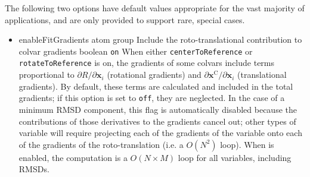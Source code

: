 The following two options have default values appropriate for the vast majority of applications, and are only provided to support rare, special cases.
\begin{itemize}

\item %
  \keydef%
    {enableFitGradients}{%
    atom group}{%
    Include the roto-translational contribution to colvar gradients}{%
    boolean}{%
    \texttt{on}}{%
    When either \texttt{centerToReference} or \texttt{rotateToReference} is on,
    the gradients of some colvars include terms proportional to
    $\partial{}R/\partial\mathbf{x}_{i}$ (rotational gradients) and
    $\partial\mathbf{x}^{\mathrm{C}}/\partial\mathbf{x}_{i}$ (translational gradients).
    By default, these terms are calculated and included in the total gradients;
    if this option is set to \texttt{off}, they are neglected.
    In the case of a minimum RMSD component, this flag is automatically disabled because the contributions of those derivatives to the gradients cancel out; other types of variable will require projecting each of the gradients of the variable onto each of the gradients of the roto-translation (i.e.{} a $O(N^2)$ loop).
    When  is enabled, the computation is a $O(N\times{}M)$ loop for all variables, including RMSDs.
}

\end{itemize}



